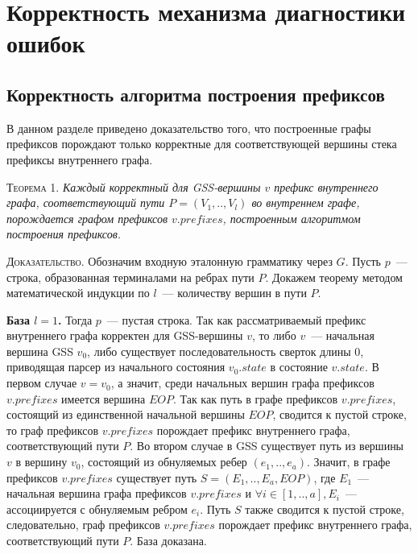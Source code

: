 \section{Корректность механизма диагностики ошибок}
\subsection{Корректность алгоритма построения префиксов}
В данном разделе приведено доказательство того, что построенные графы префиксов порождают только корректные для соответствующей вершины стека префиксы внутреннего графа. 

\textsc{Теорема 1.} 
\textit{Каждый корректный для GSS-вершины $v$ префикс внутреннего графа, соответствующий пути $P = (V_{1},..,V_{l})$ во внутреннем графе, порождается графом префиксов $v.prefixes$, построенным алгоритмом построения префиксов.}

\textsc{Доказательство.}
Обозначим входную эталонную грамматику через $G$. Пусть $p$~--- строка, образованная терминалами на ребрах пути $P$. Докажем теорему методом математической индукции по $l$~--- количеству вершин в пути $P$.

\textbf{База $l = 1$.} Тогда $p$~--- пустая строка. Так как рассматриваемый префикс внутреннего графа корректен для GSS-вершины $v$, то либо $v$~--- начальная вершина GSS $v_{0}$, либо существует последовательность сверток длины 0, приводящая парсер из начального состояния $v_{0}.state$ в состояние $v.state$. В первом случае $v = v_{0}$, а значит, среди начальных вершин графа префиксов $v.prefixes$ имеется вершина $EOP$. Так как путь в графе префиксов $v.prefixes$, состоящий из единственной начальной вершины $EOP$, сводится к пустой строке, то граф префиксов $v.prefixes$ порождает префикс внутреннего графа, соответствующий пути $P$. Во втором случае в GSS существует путь из вершины $v$ в вершину $v_{0}$, состоящий из обнуляемых ребер $(e_{1},..,e_{a})$. Значит, в графе префиксов $v.prefixes$ существует путь $S = (E_{1},..,E_{a}, EOP)$, где $E_{1}$~--- начальная вершина графа префиксов $v.prefixes$ и $\forall i \in [1,..,a], E_{i}$~--- ассоциируется с обнуляемым ребром  $e_{i}$. Путь $S$ также сводится к пустой строке, следовательно, граф префиксов $v.prefixes$ порождает префикс внутреннего графа, соответствующий пути $P$. База доказана.
% 

